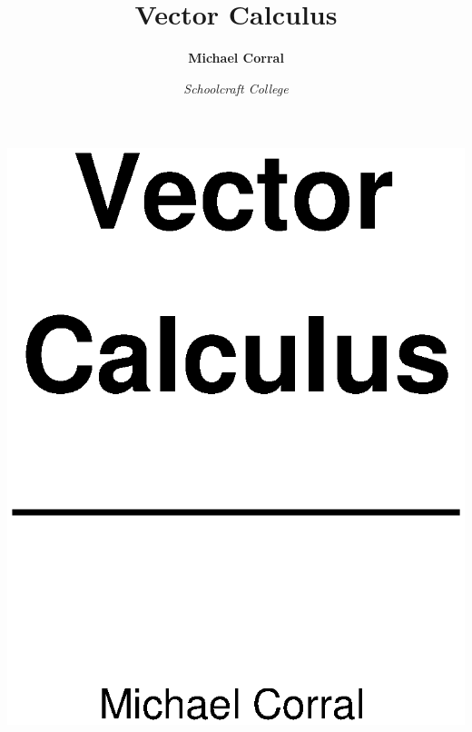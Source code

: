 \documentclass[letterpaper,11pt,titlepage,openany,twoside,numbers=noenddot,bibliography=totoc,index=totoc]{scrbook}
\theoremstyle{definition}
\theoremstyle{itexmp}
\numberwithin{figure}{section}
\begin{document}
\frontmatter
\pagestyle{empty}
\centerline{}\vspace{-25mm}
\centerline{\includegraphics[height=0.6\textheight]{calc3bookcover}}
\title{Vector Calculus}
\author{\textsf{\textbf{Michael Corral}}}
\date{\large \textsf{\textsl{Schoolcraft College}}}
\uppertitleback{\emph{About the author}:\\
Michael Corral is an Adjunct Faculty member of the Department of Mathematics at Schoolcraft College. 
He received a B.A. in Mathematics from the University of California at Berkeley, and received an M.A. in Mathematics and
an M.S. in Industrial \& Operations Engineering from the University of Michigan.\\\\
This text was typeset in \LaTeXe\medspace with the \textsf{KOMA-Script} bundle, using the GNU Emacs text editor on a
Fedora Linux system. The graphics were created using MetaPost, PGF, and Gnuplot.}
\end{document}
